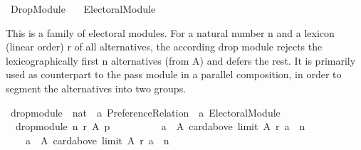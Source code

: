 %
\begin{isabellebody}%
%
%
\isadelimdocument
\isanewline
%
\endisadelimdocument
%
\isatagdocument
\isanewline
\isanewline
%
\isamarkuptrue%
%
\endisatagdocument
{\isafolddocument}%
%
\isadelimdocument
%
\endisadelimdocument
%
\isadelimtheory
%
\endisadelimtheory
%
\isatagtheory
{}\isamarkupfalse%
\ Drop{\isacharunderscore}{\kern0pt}Module\isanewline
\ \ \ {\isachardoublequoteopen}{\isachardot}{\kern0pt}{\isachardot}{\kern0pt}{\isacharslash}{\kern0pt}Electoral{\isacharunderscore}{\kern0pt}Module{\isachardoublequoteclose}\isanewline
{}%
\endisatagtheory
{\isafoldtheory}%
%
\isadelimtheory
%
\endisadelimtheory
%
\begin{isamarkuptext}%
This is a family of electoral modules. For a natural number n and a
lexicon (linear order) r of all alternatives, the according drop module
rejects the lexicographically first n alternatives (from A) and
defers the rest.
It is primarily used as counterpart to the pass module in a
parallel composition, in order to segment the alternatives into
two groups.%
\end{isamarkuptext}\isamarkuptrue%
%
\isadelimdocument
%
\endisadelimdocument
%
\isatagdocument
%
\isamarkuptrue%
%
\endisatagdocument
{\isafolddocument}%
%
\isadelimdocument
%
\endisadelimdocument
{}\isamarkupfalse%
\ drop{\isacharunderscore}{\kern0pt}module\ {\isacharcolon}{\kern0pt}{\isacharcolon}{\kern0pt}\ {\isachardoublequoteopen}nat\ {\isasymRightarrow}\ {\isacharprime}{\kern0pt}a\ Preference{\isacharunderscore}{\kern0pt}Relation\ {\isasymRightarrow}\ {\isacharprime}{\kern0pt}a\ Electoral{\isacharunderscore}{\kern0pt}Module{\isachardoublequoteclose}\ \isanewline
\ \ {\isachardoublequoteopen}drop{\isacharunderscore}{\kern0pt}module\ n\ r\ A\ p\ {\isacharequal}{\kern0pt}\isanewline
\ \ \ \ {\isacharparenleft}{\kern0pt}{\isacharbraceleft}{\kern0pt}{\isacharbraceright}{\kern0pt}{\isacharcomma}{\kern0pt}\isanewline
\ \ \ \ {\isacharbraceleft}{\kern0pt}a\ {\isasymin}\ A{\isachardot}{\kern0pt}\ card{\isacharparenleft}{\kern0pt}above\ {\isacharparenleft}{\kern0pt}limit\ A\ r{\isacharparenright}{\kern0pt}\ a{\isacharparenright}{\kern0pt}\ {\isasymle}\ n{\isacharbraceright}{\kern0pt}{\isacharcomma}{\kern0pt}\isanewline
\ \ \ \ {\isacharbraceleft}{\kern0pt}a\ {\isasymin}\ A{\isachardot}{\kern0pt}\ card{\isacharparenleft}{\kern0pt}above\ {\isacharparenleft}{\kern0pt}limit\ A\ r{\isacharparenright}{\kern0pt}\ a{\isacharparenright}{\kern0pt}\ {\isachargreater}{\kern0pt}\ n{\isacharbraceright}{\kern0pt}{\isacharparenright}{\kern0pt}{\isachardoublequoteclose}%

\end{isabellebody}
